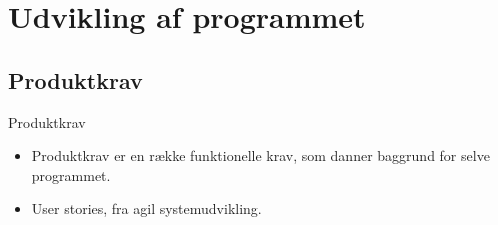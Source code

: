 \section{Udvikling af programmet}

\subsection{Produktkrav}
\begin{frame}{Produktkrav}

\begin{itemize}
	\item Produktkrav er en række funktionelle krav, som danner baggrund for selve programmet.
	\item User stories, fra agil systemudvikling.
\end{itemize}
\end{frame}

